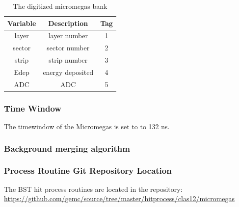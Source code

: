\begin{table}[h]
	\begin{center}
		\begin{tabular}{| c | c | c |}
			\hline \hline
			Variable         & Description  & Tag  \\
			\hline
              layer  &                                      layer number  &    1   \\
             sector  &                                     sector number  &    2   \\
              strip  &                                      strip number  &    3   \\
               Edep  &                                  energy deposited  &    4   \\
                ADC  &                                               ADC  &    5   \\
			\hline \hline
		\end{tabular}
	\end{center}
	\caption{The digitized micromegas bank}\label{tab:mmBank}
\end{table}

\subsubsection{Time Window}
The timewindow of the Micromegas is set to to 132 ns.

\subsubsection{Background merging algorithm}

\subsubsection{Process Routine Git Repository Location}
The BST hit process routines are located in the repository: \url{https://github.com/gemc/source/tree/master/hitprocess/clas12/micromegas}

